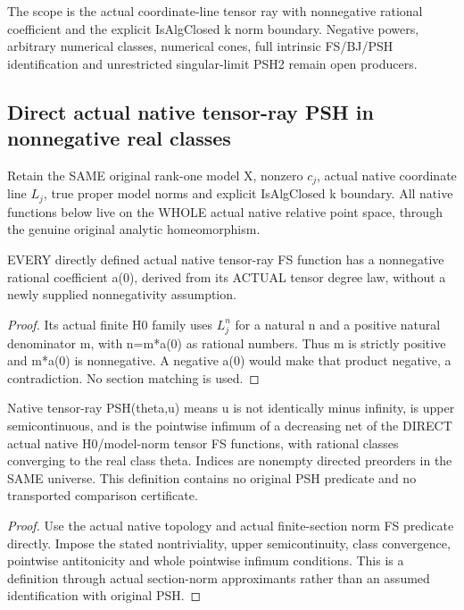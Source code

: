 The scope is the actual coordinate-line tensor ray with nonnegative
rational coefficient and the explicit IsAlgClosed k norm boundary.
Negative powers, arbitrary numerical classes, numerical cones, full
intrinsic FS/BJ/PSH identification and unrestricted singular-limit PSH2
remain open producers.

\subsection{Direct actual native tensor-ray PSH in nonnegative real classes}
Retain the SAME original rank-one model X, nonzero $c_j$, actual native
coordinate line $L_j$, true proper model norms and explicit IsAlgClosed k
boundary. All native functions below live on the WHOLE actual native
relative point space, through the genuine original analytic homeomorphism.

\begin{lemma}
\label{lem:seven-native-tensor-fs-nonnegative-degree}

EVERY directly defined actual native tensor-ray FS function has a
nonnegative rational coefficient a(0), derived from its ACTUAL tensor
degree law, without a newly supplied nonnegativity assumption.
\end{lemma}
\begin{proof}
Its actual finite H0 family uses $L_j^n$ for a natural n and a positive
natural denominator m, with n=m*a(0) as rational numbers. Thus m is
strictly positive and m*a(0) is nonnegative. A negative a(0) would make
that product negative, a contradiction. No section matching is used.
\end{proof}

\begin{definition}
\label{def:seven-native-direct-tensor-psh}
\leanok
Native tensor-ray PSH(theta,u) means u is not identically minus infinity,
is upper semicontinuous, and is the pointwise infimum of a decreasing
net of the DIRECT actual native H0/model-norm tensor FS functions, with
rational classes converging to the real class theta. Indices are nonempty
directed preorders in the SAME universe. This definition contains no
original PSH predicate and no transported comparison certificate.
\end{definition}
\begin{proof}
Use the actual native topology and actual finite-section norm FS predicate
directly. Impose the stated nontriviality, upper semicontinuity, class
convergence, pointwise antitonicity and whole pointwise infimum conditions.
This is a definition through actual section-norm approximants rather than
an assumed identification with original PSH.
\end{proof}

